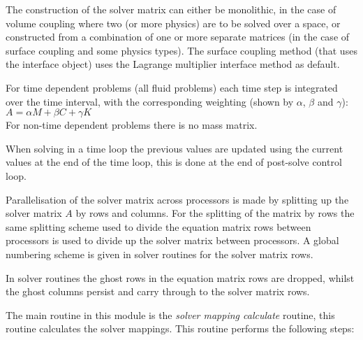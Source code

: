 The construction of the solver matrix can either be monolithic, in the case of
volume coupling where two (or more physics) are to be solved over a space, or
constructed from a combination of one or more separate matrices (in the case of
surface coupling and some physics types). The surface coupling method (that
uses the interface object) uses the Lagrange multiplier interface method as 
default.

For time dependent problems (all fluid problems) each time step is 
integrated over the time interval, with the corresponding weighting (shown by 
$\alpha$, $\beta$ and $\gamma$): $A=\alpha M + \beta C+ \gamma K$ \\
For non-time dependent problems there is no mass matrix.

When solving in a time loop the previous values are updated using the current
values at the end of the time loop, this is done at the end of post-solve
control loop.

Parallelisation of the solver matrix across processors is made by splitting up
the solver matrix $A$ by rows and columns. For the splitting of the matrix by rows
the same splitting scheme used to divide the equation matrix rows between
processors is used to divide up the solver matrix between processors. A global
numbering scheme is given in solver routines for the solver matrix rows.

In solver routines the ghost rows in the equation matrix rows are dropped,
whilst the ghost columns persist and carry through to the solver matrix rows.

The main routine in this module is the \emph{solver mapping calculate} routine,
this routine calculates the solver mappings. This routine performs the 
following steps:


